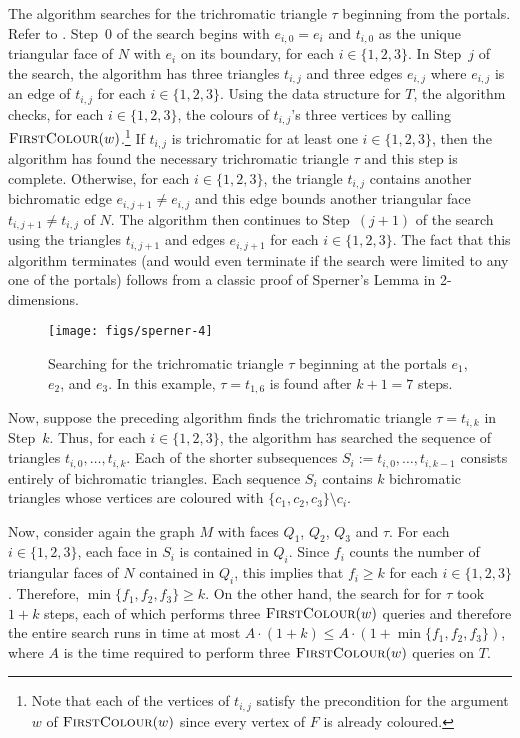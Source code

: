 \documentclass[kpfonts]{patmorin}
\let\le\leqslant
\let\ge\geqslant
\begin{document}
 The algorithm searches for the trichromatic triangle $\tau$ beginning from the portals.  Refer to . Step~0 of the search begins with $e_{i,0}=e_i$ and $t_{i,0}$ as the unique triangular face of $N$ with $e_i$ on its boundary, for each $i\in\{1,2,3\}$. In Step~$j$ of the search, the algorithm has three triangles $t_{i,j}$ and three edges $e_{i,j}$ where $e_{i,j}$ is an edge of $t_{i,j}$ for each $i\in\{1,2,3\}$.  Using the data structure for $T$, the algorithm checks, for each $i\in\{1,2,3\}$, the colours of $t_{i,j}$'s three vertices by calling $\textsc{FirstColour}(w)$.\footnote{Note that each of the vertices of $t_{i,j}$ satisfy the precondition for the argument $w$ of $\textsc{FirstColour}(w)$ since every vertex of $F$ is already coloured.}  If $t_{i,j}$ is trichromatic for at least one $i\in\{1,2,3\}$, then the algorithm has found the necessary trichromatic triangle $\tau$ and this step is complete. Otherwise, for each $i\in\{1,2,3\}$, the triangle $t_{i,j}$ contains another bichromatic edge $e_{i,j+1}\neq e_{i,j}$ and this edge bounds another triangular face $t_{i,j+1}\neq t_{i,j}$ of $N$.  The algorithm then continues to Step~$(j+1)$ of the search using the triangles $t_{i,j+1}$ and edges $e_{i,j+1}$ for each $i\in\{1,2,3\}$.  The fact that this algorithm terminates (and would even terminate if the search were limited to any one of the portals) follows from a classic proof of Sperner's Lemma in 2-dimensions.
 
 \begin{figure}
   \begin{center}
     \texttt{[image: figs/sperner-4]}
   \end{center}
   \caption{Searching for the trichromatic triangle $\tau$ beginning at the portals $e_1$, $e_2$, and $e_3$. In this example, $\tau=t_{1,6}$ is found after $k+1=7$ steps.}
 \end{figure}
 
 
 Now, suppose the preceding algorithm finds the trichromatic triangle $\tau=t_{i,k}$ in Step~$k$.  Thus, for each $i\in\{1,2,3\}$, the algorithm has searched the sequence of triangles $t_{i,0},\ldots,t_{i,k}$.  Each of the shorter subsequences $S_i:=t_{i,0},\ldots,t_{i,k-1}$ consists entirely of bichromatic triangles. Each sequence $S_i$ contains $k$ bichromatic triangles whose vertices are coloured with $\{c_1,c_2,c_3\}\setminus c_i$.
 
 Now, consider again the graph $M$ with faces $Q_1$, $Q_2$, $Q_3$ and $\tau$. For each $i\in\{1,2,3\}$, each face in $S_i$ is contained in $Q_i$.  Since $f_i$ counts the number of triangular faces of $N$ contained in $Q_i$, this implies that $f_i\ge k$ for each $i\in \{1,2,3\}$.  Therefore, $\min\{f_1,f_2,f_3\}\ge k$.  On the other hand, the search for for $\tau$ took $1+k$ steps, each of which performs three $\textsc{FirstColour}(w)$ queries and therefore the entire search runs in time at most $A\cdot(1+k)\le A\cdot(1+\min\{f_1,f_2,f_3\})$, where $A$ is the time required to perform three $\textsc{FirstColour}(w)$ queries on $T$.
 
\end{document}
